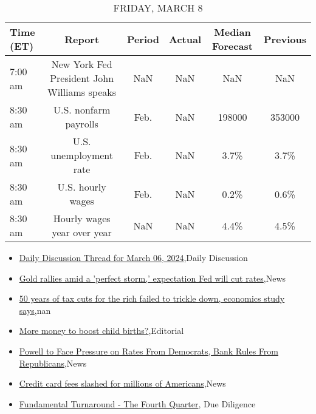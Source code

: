 \documentclass{article}%
\begin{document}
%


\begin{table}[htbp]%
\caption{FRIDAY, MARCH 8}%
\centering%
\begin{adjustbox}{width=1\textwidth}%
\begin{tabular}{lccccc}
\toprule
Time (ET) &                                      Report & Period & Actual & Median Forecast & Previous \\
\midrule
  7:00 am & New York Fed President John Williams speaks &    NaN &    NaN &             NaN &      NaN \\
  8:30 am &                       U.S. nonfarm payrolls &   Feb. &    NaN &          198000 &   353000 \\
  8:30 am &                      U.S. unemployment rate &   Feb. &    NaN &            3.7\% &     3.7\% \\
  8:30 am &                           U.S. hourly wages &   Feb. &    NaN &            0.2\% &     0.6\% \\
  8:30 am &                 Hourly wages year over year &    NaN &    NaN &            4.4\% &     4.5\% \\
\bottomrule
\end{tabular}
%
\end{adjustbox}%
\end{table}

%
\begin{itemize}%
\item%
\href{https://reddit.com/r/wallstreetbets/comments/1b7wyyy/daily\_discussion\_thread\_for\_march\_06\_2024/}{Daily Discussion Thread for March 06, 2024},Daily Discussion%
\item%
\href{https://reddit.com/r/wallstreetbets/comments/1b7uftw/gold\_rallies\_amid\_a\_perfect\_storm\_expectation\_fed/}{Gold rallies amid a 'perfect storm,' expectation Fed will cut rates},News%
\item%
\href{https://reddit.com/r/Economics/comments/1b7svga/50\_years\_of\_tax\_cuts\_for\_the\_rich\_failed\_to/}{50 years of tax cuts for the rich failed to trickle down, economics study says},nan%
\item%
\href{https://reddit.com/r/Economics/comments/1b7k1lb/more\_money\_to\_boost\_child\_births/}{More money to boost child births?},Editorial%
\item%
\href{https://reddit.com/r/Economics/comments/1b7hizs/powell\_to\_face\_pressure\_on\_rates\_from\_democrats/}{Powell to Face Pressure on Rates From Democrats, Bank Rules From Republicans},News%
\item%
\href{https://reddit.com/r/Economics/comments/1b7e0jh/credit\_card\_fees\_slashed\_for\_millions\_of\_americans/}{Credit card fees slashed for millions of Americans},News%
\item%
\href{https://reddit.com/r/Superstonk/comments/1b7xz4n/fundamental\_turnaround\_the\_fourth\_quarter/}{Fundamental Turnaround - The Fourth Quarter}, Due Diligence%
\end{itemize}%
\end{document}
